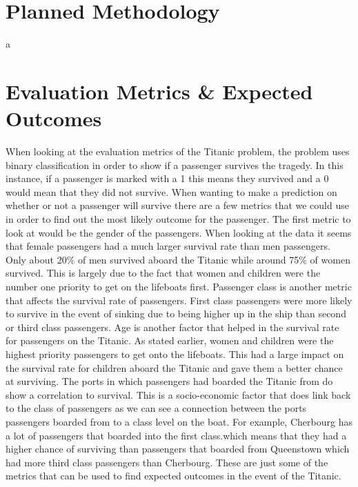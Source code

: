 \documentclass{APA}
\begin{document}
\section{Planned Methodology}
a
\newpage



\section{Evaluation Metrics \& Expected Outcomes}
	When looking at the evaluation metrics of the Titanic problem, the problem uses binary classification in order to show if a passenger survives the tragedy. In this instance, if a passenger is marked with a 1 this means they survived and a 0 would mean that they did not survive. When wanting to make a prediction on whether or not a passenger will survive there are a few metrics that we could use in order to find out the most likely outcome for the passenger.
	The first metric to look at would be the gender of the passengers. When looking at the data it seems that female passengers had a much larger survival rate than men passengers. Only about 20\% of men survived aboard the Titanic while around 75\% of women survived. This is largely due to the fact that women and children were the number one priority to get on the lifeboats first. Passenger class is another metric that affects the survival rate of passengers. First class passengers were more likely to survive in the event of sinking due to being higher up in the ship than second or third class passengers. Age is another factor that helped in the survival rate for passengers on the Titanic. As stated earlier, women and children were the highest priority passengers to get onto the lifeboats. This had a large impact on the survival rate for children aboard the Titanic and gave them a better chance at surviving. The ports in which passengers had boarded the Titanic from do show a correlation to survival. This is a socio-economic factor that does link back to the class of passengers as we can see a connection between the ports passengers boarded from to a class level on the boat. For example, Cherbourg has a lot of passengers that boarded into the first class.which means that they had a higher chance of surviving than passengers that boarded from Queenstown which had more third class passengers than Cherbourg. These are just some of the metrics that can be used to find expected outcomes in the event of the Titanic.

\newpage
\end{document}
